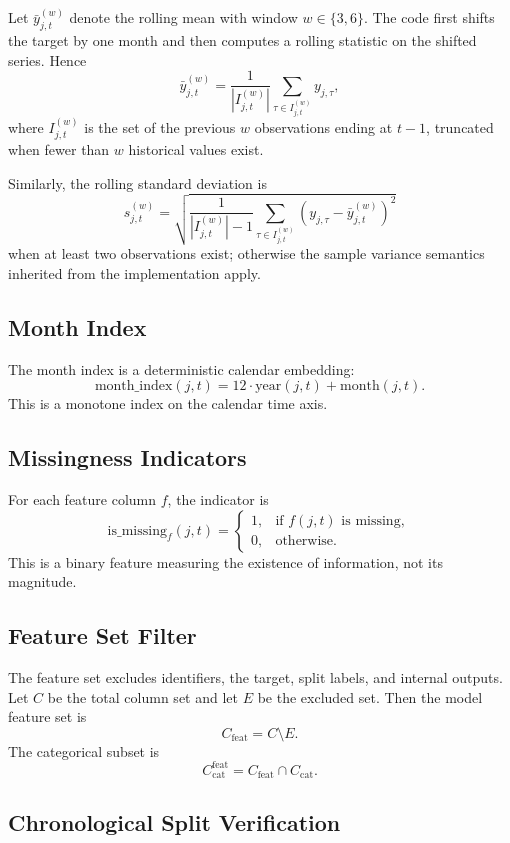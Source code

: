 \documentclass[11pt]{article}
\newcommand{\1}{\mathbf{1}}
\begin{document}
Let $\bar y_{j,t}^{(w)}$ denote the rolling mean with window $w \in \{3,6\}$. The code first shifts the target by one month and then computes a rolling statistic on the shifted series. Hence
\[
\bar y_{j,t}^{(w)} = \frac{1}{|I_{j,t}^{(w)}|} \sum_{\tau \in I_{j,t}^{(w)}} y_{j,\tau},
\]
where $I_{j,t}^{(w)}$ is the set of the previous $w$ observations ending at $t-1$, truncated when fewer than $w$ historical values exist.

Similarly, the rolling standard deviation is
\[
s_{j,t}^{(w)} = \sqrt{\frac{1}{|I_{j,t}^{(w)}| - 1} \sum_{\tau \in I_{j,t}^{(w)}} (y_{j,\tau} - \bar y_{j,t}^{(w)})^2}
\]
when at least two observations exist; otherwise the sample variance semantics inherited from the implementation apply.

\subsection{Month Index}

The month index is a deterministic calendar embedding:
\[
\mathrm{month\_index}(j,t) = 12 \cdot \mathrm{year}(j,t) + \mathrm{month}(j,t).
\]
This is a monotone index on the calendar time axis.

\subsection{Missingness Indicators}

For each feature column $f$, the indicator is
\[
\mathrm{is\_missing}_f(j,t) =
\begin{cases}
1, & \text{if } f(j,t) \text{ is missing},\\
0, & \text{otherwise}.
\end{cases}
\]
This is a binary feature measuring the existence of information, not its magnitude.

\subsection{Feature Set Filter}

The feature set excludes identifiers, the target, split labels, and internal outputs. Let $C$ be the total column set and let $E$ be the excluded set. Then the model feature set is
\[
C_{\mathrm{feat}} = C \setminus E.
\]
The categorical subset is
\[
C_{\mathrm{cat}}^{\mathrm{feat}} = C_{\mathrm{feat}} \cap C_{\mathrm{cat}}.
\]

\subsection{Chronological Split Verification}
\end{document}
